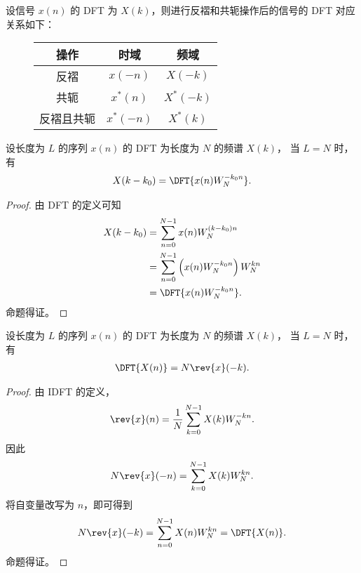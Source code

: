 \begin{property}
    设信号 $x(n)$ 的 DFT 为 $X(k)$，则进行反褶和共轭操作后的信号的 DFT 对应关系如下：
    \begin{figure}[H]
        \begin{tabular}
            {c||c|c}
            操作 & 时域 & 频域 \\
            \hline
            反褶 & $x(-n)$ & $X(-k)$ \\
            共轭 & $x^*(n)$ & $X^*(-k)$ \\
            反褶且共轭 & $x^*(-n)$ & $X^*(k)$ \\
        \end{tabular}
    \end{figure}
\end{property}

\begin{property}
    设长度为 $L$ 的序列 $x(n)$ 的 DFT 为长度为 $N$ 的频谱 $X(k)$，
    当 $L = N$ 时，有
    \begin{align*}
        X(k - k_0) = \DFT{x(n)W_N^{-k_0n}}.
    \end{align*}
\end{property}

\begin{proof}
    由 DFT 的定义可知
    \begin{align*}
        X(k - k_0) & = \sum_{n = 0}^{N - 1}x(n)W_N^{(k - k_0)n} \\
        & = \sum_{n = 0}^{N - 1}\left(x(n)W_N^{-k_0n}\right)W_N^{kn} \\
        & = \DFT{x(n)W_N^{-k_0n}}.
    \end{align*}
    命题得证。
\end{proof}

\begin{property}
    设长度为 $L$ 的序列 $x(n)$ 的 DFT 为长度为 $N$ 的频谱 $X(k)$，
    当 $L = N$ 时，有
    \begin{align*}
        \DFT{X(n)} = N\rev{x}(-k).
    \end{align*}
\end{property}

\begin{proof}
    由 IDFT 的定义，
    \begin{align*}
        \rev{x}(n) = \frac{1}{N}\sum_{k = 0}^{N - 1}X(k)W_N^{-kn}.
    \end{align*}
    因此
    \begin{align*}
        N\rev{x}(-n) = \sum_{k = 0}^{N - 1}X(k)W_N^{kn}.
    \end{align*}
    将自变量改写为 $n$，即可得到
    \begin{align*}
        N\rev{x}(-k) = \sum_{n = 0}^{N - 1}X(n)W_N^{kn} = \DFT{X(n)}.
    \end{align*}
    命题得证。
\end{proof}

